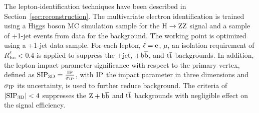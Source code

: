 \documentclass[11pt,twoside,a4paper,cmspaper,final,collab]{cms-tdr}
\begin{document}
The lepton-identification techniques have been described in Section~\ref{sec:reconstruction}.
The multivariate electron identification is trained using a Higgs boson MC simulation sample for the
$\mathrm{H}\rightarrow\mathrm{Z}\mathrm{Z}$ signal and a sample of \PW+1-jet events from data for the background.
The working point is  optimized using a \cPZ+1-jet data sample.
For each lepton, $\ell = \mathrm{e}$, $\mu$, an isolation requirement of
$ R_\text{Iso}^{\ell} < 0.4$ is applied to suppress
the \cPZ+jet, \cPZ+$\mathrm{b}\overline{\mathrm{b}}$, and $\mathrm{t}\overline{\mathrm{t}}$ backgrounds.
In addition, the lepton impact parameter significance with respect
to the primary vertex, defined as
${\rm SIP_{3D}}= \frac{\rm IP}{\sigma_{\rm IP}} $,
with ${\rm IP}$ the impact parameter in three dimensions
and  $\sigma_{\rm IP}$ its uncertainty, is used to further reduce background.
The criteria of $| {\rm SIP_{3D}}  | < 4$ suppresses
the $\mathrm{Z} + \mathrm{b}\overline{\mathrm{b}}$ and $\mathrm{t}\overline{\mathrm{t}}$ backgrounds with negligible effect on the
signal efficiency.
\end{document}
